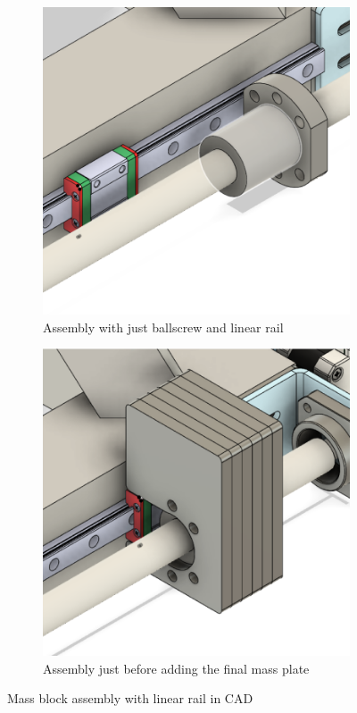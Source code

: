 \begin{figure}[p]
  \centering
  \begin{subfigure}[t]{0.45\textwidth}
    \includegraphics[width=\linewidth]{figures/linear_act_1.png}
    \caption{Assembly with just ballscrew and linear rail}
  \end{subfigure}\hfill
  \begin{subfigure}[t]{0.45\textwidth}
    \includegraphics[width=\linewidth]{figures/linear_act_2.png}
    \caption{Assembly just before adding the final mass plate}
  \end{subfigure}
  \caption{Mass block assembly with linear rail in CAD}
  \label{fig:linear_act}
\end{figure}

